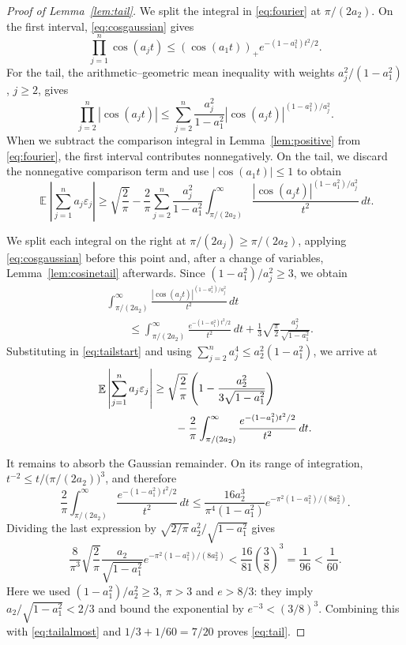 \documentclass[a4paper,twoside,11pt,reqno]{amsart}
\theoremstyle{definition}
\theoremstyle{remark}
\newcommand{\1}{\mathbbm{1}}
\DeclareMathOperator{\E}{\mathbb{E}}
\begin{document}
\begin{proof}[Proof of Lemma~\ref{lem:tail}]
We split the integral in \eqref{eq:fourier} at $\pi/(2a_2)$. On the first interval, \eqref{eq:cosgaussian} gives
\[
 \prod_{j=1}^n\cos(a_jt)
 \le(\cos(a_1t))_+e^{-(1-a_1^2)t^2/2}.
\]
For the tail, the arithmetic--geometric mean inequality with weights $a_j^2/(1-a_1^2)$, $j\ge2$, gives
\[
 \prod_{j=2}^n|\cos(a_jt)|
 \le\sum_{j=2}^n\frac{a_j^2}{1-a_1^2}
             |\cos(a_jt)|^{(1-a_1^2)/a_j^2}.
\]
When we subtract the comparison integral in Lemma~\ref{lem:positive} from \eqref{eq:fourier}, the first interval contributes nonnegatively. On the tail, we discard the nonnegative comparison term and use $|\cos(a_1t)|\le1$ to obtain
\begin{equation}\label{eq:tailstart}
 \E\left|\sum_{j=1}^n a_j\varepsilon_j\right|
 \ge\sqrt{\frac2\pi}
 -\frac2\pi\sum_{j=2}^n\frac{a_j^2}{1-a_1^2}
 \int_{\pi/(2a_2)}^\infty
 \frac{|\cos(a_jt)|^{(1-a_1^2)/a_j^2}}{t^2}\,dt.
\end{equation}

We split each integral on the right at $\pi/(2a_j)\ge\pi/(2a_2)$, applying \eqref{eq:cosgaussian} before this point and, after a change of variables, Lemma~\ref{lem:cosinetail} afterwards. Since $(1-a_1^2)/a_j^2\ge3$, we obtain
\begin{align*}
 &\int_{\pi/(2a_2)}^\infty
 \frac{|\cos(a_jt)|^{(1-a_1^2)/a_j^2}}{t^2}\,dt\\
 &\qquad\le\int_{\pi/(2a_2)}^\infty\frac{e^{-(1-a_1^2)t^2/2}}{t^2}\,dt
     +\frac13\sqrt{\frac\pi2}\frac{a_j^2}{\sqrt{1-a_1^2}}.
\end{align*}
Substituting in \eqref{eq:tailstart} and using $\sum_{j=2}^n a_j^4\le a_2^2(1-a_1^2)$, we arrive at
\begin{align}\label{eq:tailalmost}
 \E\left|\sum_{j=1}^n a_j\varepsilon_j\right|
 &\ge\sqrt{\frac2\pi}
       \left(1-\frac{a_2^2}{3\sqrt{1-a_1^2}}\right)\notag\\
 &\qquad-\frac2\pi\int_{\pi/(2a_2)}^\infty
                    \frac{e^{-(1-a_1^2)t^2/2}}{t^2}\,dt.
\end{align}

It remains to absorb the Gaussian remainder. On its range of integration,
$t^{-2}\le t/\bigl(\pi/(2a_2)\bigr)^3$, and therefore
\[
 \frac2\pi\int_{\pi/(2a_2)}^\infty
        \frac{e^{-(1-a_1^2)t^2/2}}{t^2}\,dt
 \le\frac{16a_2^3}{\pi^4(1-a_1^2)}
           e^{-\pi^2(1-a_1^2)/(8a_2^2)}.
\]
Dividing the last expression by $\sqrt{2/\pi}\,a_2^2/\sqrt{1-a_1^2}$ gives
\[
 \frac8{\pi^3}\sqrt{\frac2\pi}\frac{a_2}{\sqrt{1-a_1^2}}
 e^{-\pi^2(1-a_1^2)/(8a_2^2)}
 <\frac{16}{81}\left(\frac38\right)^3
 =\frac1{96}<\frac1{60}.
\]
Here we used $(1-a_1^2)/a_2^2\ge3$, $\pi>3$ and $e>8/3$: they imply $a_2/\sqrt{1-a_1^2}<2/3$ and bound the exponential by $e^{-3}<(3/8)^3$. Combining this with \eqref{eq:tailalmost} and $1/3+1/60=7/20$ proves \eqref{eq:tail}.
\end{proof}
\end{document}
